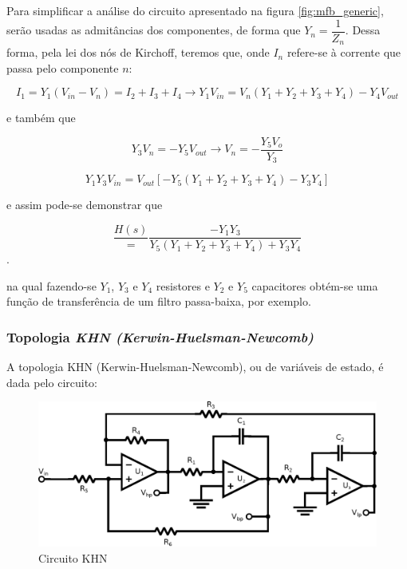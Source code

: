 Para simplificar a análise do circuito apresentado na figura \ref{fig:mfb_generic}, serão usadas as admitâncias dos componentes, de forma que $Y_n = \dfrac{1}{Z_n}$. Dessa forma, pela lei dos nós de Kirchoff, teremos que, onde $I_n$ refere-se à corrente que passa pelo componente $n$:

\begin{equation}
I_1 = Y_1 (V_{in} - V_{n}) = I_2 + I_3 + I_4 \rightarrow Y_1 V_{in} = V_n (Y_1 + Y_2 + Y_3 + Y_4) - Y_4 V_{out}
\end{equation}

e também que

\begin{equation}
Y_3 V_n = -Y_5 V_{out} \rightarrow V_{n} = -\frac{Y_5 V_o}{Y_3} 
\end{equation}

\begin{equation} 
Y_1 Y_3 V_{in} = V_{out}[-Y_5 (Y_1 + Y_2 + Y_3 + Y_4) - Y_3 Y_4]
\end{equation}

e assim pode-se demonstrar que

\begin{equation}
\frac{H(s)} = \frac{-Y_1 Y_3}{Y_5 (Y_1 + Y_2 + Y_3 + Y_4) + Y_3 Y_4}
\end{equation}.

na qual fazendo-se $Y_1$, $Y_3$ e $Y_4$ resistores e $Y_2$ e $Y_5$ capacitores obtém-se uma função de transferência de um filtro passa-baixa, por exemplo. 

\subsubsection{Topologia \textit{KHN (Kerwin-Huelsman-Newcomb)}}
A topologia KHN (Kerwin-Huelsman-Newcomb), ou de variáveis de estado, é dada pelo circuito:

\begin{figure}[H]
  \centering
  \includegraphics[scale=0.82]{images/khn_generic}
  \caption{Circuito KHN}
  \label{fig:khn_generic}
\end{figure}


